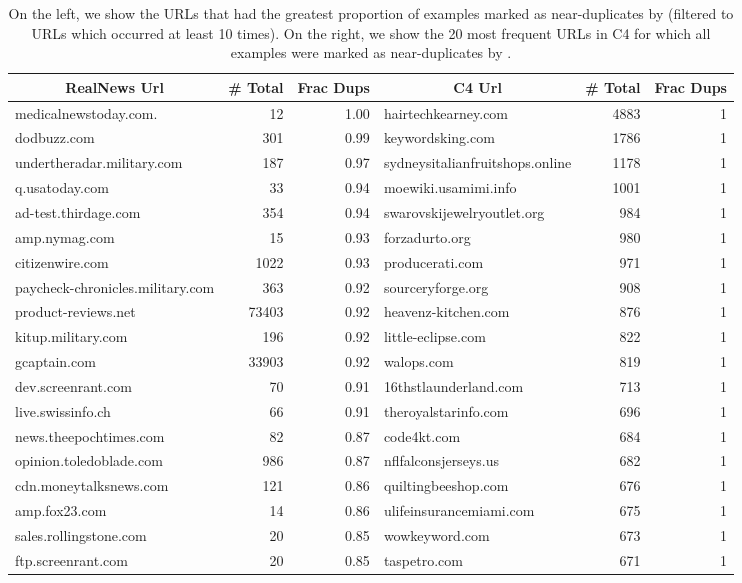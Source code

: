 \begin{table*}[ttbp]
  \caption{On the left, we show the URLs that had the greatest proportion of examples marked as near-duplicates by \Approx (filtered to URLs which occurred at least 10 times). On the right, we show the 20 most frequent URLs in C4 for which all examples were marked as near-duplicates by \Approx.}
  \label{tab:urls}%
  \centering
  \small
    \begin{tabular}{lrr||lrr}
    \toprule
    \multicolumn{1}{c}{RealNews Url} & \multicolumn{1}{c}{\# Total} & \multicolumn{1}{c}{Frac Dups} & \multicolumn{1}{c}{C4 Url} & \multicolumn{1}{c}{\# Total} & \multicolumn{1}{c}{Frac Dups} \\
    \hline
    medicalnewstoday.com. & 12    & 1.00  & hairtechkearney.com & 4883  & 1 \\
    dodbuzz.com & 301   & 0.99  & keywordsking.com & 1786  & 1 \\
    undertheradar.military.com & 187   & 0.97  & sydneysitalianfruitshops.online & 1178  & 1 \\
    q.usatoday.com & 33    & 0.94  & moewiki.usamimi.info & 1001  & 1 \\
    ad-test.thirdage.com & 354   & 0.94  & swarovskijewelryoutlet.org & 984   & 1 \\
    amp.nymag.com & 15    & 0.93  & forzadurto.org & 980   & 1 \\
    citizenwire.com & 1022  & 0.93  & producerati.com & 971   & 1 \\
    paycheck-chronicles.military.com & 363   & 0.92  & sourceryforge.org & 908   & 1 \\
    product-reviews.net & 73403 & 0.92  & heavenz-kitchen.com & 876   & 1 \\
    kitup.military.com & 196   & 0.92  & little-eclipse.com & 822   & 1 \\
    gcaptain.com & 33903 & 0.92  & walops.com & 819   & 1 \\
    dev.screenrant.com & 70    & 0.91  & 16thstlaunderland.com & 713   & 1 \\
    live.swissinfo.ch & 66    & 0.91  & theroyalstarinfo.com & 696   & 1 \\
    news.theepochtimes.com & 82    & 0.87  & code4kt.com & 684   & 1 \\
    opinion.toledoblade.com & 986   & 0.87  & nflfalconsjerseys.us & 682   & 1 \\
    cdn.moneytalksnews.com & 121   & 0.86  & quiltingbeeshop.com & 676   & 1 \\
    amp.fox23.com & 14    & 0.86  & ulifeinsurancemiami.com & 675   & 1 \\
    sales.rollingstone.com & 20    & 0.85  & wowkeyword.com & 673   & 1 \\
    ftp.screenrant.com & 20    & 0.85  & taspetro.com & 671   & 1 \\
    \bottomrule
    \end{tabular}%
\end{table*}%